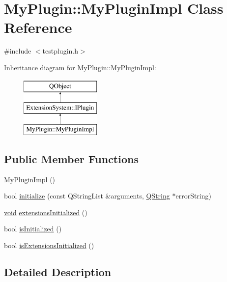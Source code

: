 \hypertarget{class_my_plugin_1_1_my_plugin_impl}{\section{My\-Plugin\-:\-:My\-Plugin\-Impl Class Reference}
\label{class_my_plugin_1_1_my_plugin_impl}
}


{\ttfamily \#include $<$testplugin.\-h$>$}

Inheritance diagram for My\-Plugin\-:\-:My\-Plugin\-Impl\-:\begin{figure}[H]
\begin{center}
\leavevmode
\includegraphics[height=3.000000cm]{class_my_plugin_1_1_my_plugin_impl}
\end{center}
\end{figure}
\subsection*{Public Member Functions}
\begin{DoxyCompactItemize}
\item 
\hyperlink{class_my_plugin_1_1_my_plugin_impl_a9c5dc5a0442c15477dafda27aaaa4dca}{My\-Plugin\-Impl} ()
\item 
bool \hyperlink{class_my_plugin_1_1_my_plugin_impl_a917bc0c4caf9ab591971b7b7d45fbaa8}{initialize} (const Q\-String\-List \&arguments, \hyperlink{group___u_a_v_objects_plugin_gab9d252f49c333c94a72f97ce3105a32d}{Q\-String} $\ast$error\-String)
\item 
\hyperlink{group___u_a_v_objects_plugin_ga444cf2ff3f0ecbe028adce838d373f5c}{void} \hyperlink{class_my_plugin_1_1_my_plugin_impl_a4ad1abbd9f078e73814e7e49232a9b6b}{extensions\-Initialized} ()
\item 
bool \hyperlink{class_my_plugin_1_1_my_plugin_impl_a3bd4c7c640ec6db82acc7ca660288a7a}{is\-Initialized} ()
\item 
bool \hyperlink{class_my_plugin_1_1_my_plugin_impl_a0128f76dfe36041c70eecd9ecb7a5aa8}{is\-Extensions\-Initialized} ()
\end{DoxyCompactItemize}


\subsection{Detailed Description}


